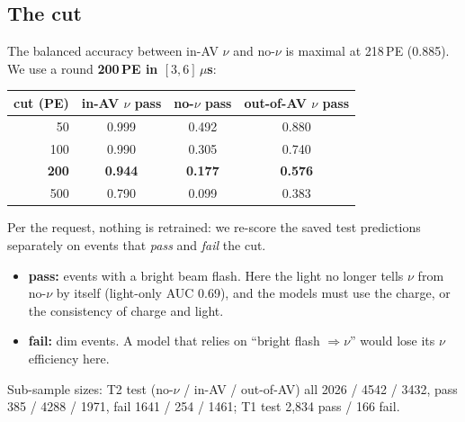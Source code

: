 \documentclass[11pt,a4paper]{article}
\begin{document}
\subsection{The cut}
The balanced accuracy between in-AV $\nu$ and no-$\nu$ is maximal at 218\,PE (0.885). We use a round \textbf{200\,PE in $[3,6]\,\mu$s}:
\begin{center}\small
\begin{tabular}{rccc}\toprule
cut (PE) & in-AV $\nu$ pass & no-$\nu$ pass & out-of-AV $\nu$ pass\\\midrule
50 & 0.999 & 0.492 & 0.880\\
100 & 0.990 & 0.305 & 0.740\\
\textbf{200} & \textbf{0.944} & \textbf{0.177} & \textbf{0.576}\\
500 & 0.790 & 0.099 & 0.383\\\bottomrule
\end{tabular}
\end{center}
Per the request, nothing is retrained: we re-score the saved test predictions separately on events that \emph{pass} and \emph{fail} the cut.
\begin{itemize}
  \item \textbf{pass:} events with a bright beam flash. Here the light no longer tells $\nu$ from no-$\nu$ by itself (light-only AUC 0.69), and the models must use the charge, or the consistency of charge and light.
  \item \textbf{fail:} dim events. A model that relies on ``bright flash $\Rightarrow\nu$'' would lose its $\nu$ efficiency here.
\end{itemize}
Sub-sample sizes: T2 test (no-$\nu$ / in-AV / out-of-AV) all 2026 / 4542 / 3432, pass 385 / 4288 / 1971, fail 1641 / 254 / 1461; T1 test 2{,}834 pass / 166 fail.
\end{document}
